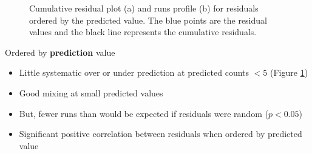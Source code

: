 \begin{frame}[fragile]
\begin{figure}[h!]
  \centering
    \caption{Cumulative residual plot (a) and runs profile (b) for residuals ordered by the predicted value.  The blue points are the residual values and the black line represents the cumulative residuals.}
  \label{fig:geeruns2}
\end{figure}
\end{frame}

\begin{frame}[fragile]
Ordered by \textbf{prediction} value
\begin{itemize}
\item Little systematic over or under prediction at predicted counts $< 5$ (Figure \ref{fig:geeruns2})
\item Good mixing at small predicted values
\item But, fewer runs than would be expected if residuals were random ($p<0.05$)
\item Significant positive correlation between residuals when ordered by predicted value
\end{itemize}
\end{frame}

